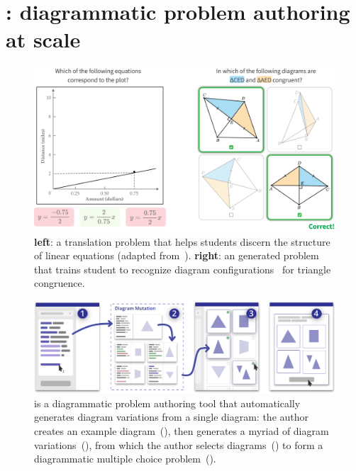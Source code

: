 \chapter{\Edgeworth: diagrammatic problem authoring at scale}
\label{chp:edgeworth}

\begin{figure}[h]
    \centering
    \includegraphics[width=0.88\linewidth]{assets/chapter-3/translation-problem.pdf}
    \caption{\textbf{left}: a translation problem that helps students discern the structure of linear equations (adapted from~\cite{perceptualLearning}). \textbf{right}: an \Edgeworth generated problem that trains student to recognize diagram configurations~\cite{Koedinger1990a} for triangle congruence.}
    \label{fig:translation-problem}
\end{figure}

\vspace{10pt}

\begin{figure}
    \centering
    \includegraphics[width=\linewidth]{assets/chapter-3/edgeworth-teaser.pdf}
    \caption{\Edgeworth is a diagrammatic problem authoring tool that automatically generates diagram variations from a single diagram: \textmd{the author creates an example diagram~(), then \Edgeworth generates a myriad of diagram variations~(), from which the author selects diagrams~() to form a diagrammatic multiple choice problem~().}}
    \label{fig:teaser}
\end{figure}


